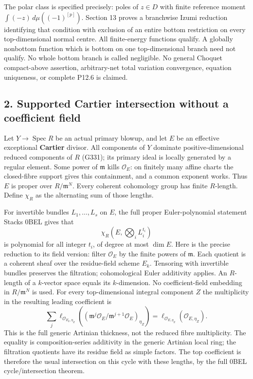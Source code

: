\documentclass[
]{article}
\begin{document}
The polar class is specified precisely: poles of \(z\in D\) with finite
reference moment \(\int(-z)\,d\mu((-1)^{[p]})\). Section 13 proves a
branchwise Izumi reduction identifying that condition with exclusion of
an entire bottom restriction on every top-dimensional normal centre. All
finite-energy functions qualify. A globally nonbottom function which is
bottom on one top-dimensional branch need not qualify. No whole bottom
branch is called negligible. No general Choquet compact-above assertion,
arbitrary-net total variation convergence, equation uniqueness, or
complete P12.6 is claimed.

\subsection{2. Supported Cartier intersection without a coefficient
field}\label{supported-cartier-intersection-without-a-coefficient-field}

Let \(Y\to\operatorname{Spec}R\) be an actual primary blowup, and let
\(E\) be an effective exceptional \textbf{Cartier} divisor. All
components of \(Y\) dominate positive-dimensional reduced components of
\(R\) (G331); its primary ideal is locally generated by a regular
element. Some power of \(\mathfrak m\) kills \(\mathcal O_E\): on
finitely many affine charts the closed-fibre support gives this
containment, and a common exponent works. Thus \(E\) is proper over
\(R/\mathfrak m^N\). Every coherent cohomology group has finite
\(R\)-length. Define \(\chi_R\) as the alternating sum of those lengths.

For invertible bundles \(L_1,\ldots,L_s\) on \(E\), the full proper
Euler-polynomial statement Stacks 0BEL gives that
\[\chi_R(E,\bigotimes_i L_i^{t_i})\] is polynomial for all integer
\(t_i\), of degree at most \(\dim E\). Here is the precise reduction to
its field version: filter \(\mathcal O_E\) by the finite powers of
\(\mathfrak m\). Each quotient is a coherent sheaf over the
residue-field scheme \(E_k\). Tensoring with invertible bundles
preserves the filtration; cohomological Euler additivity applies. An
\(R\)-length of a \(k\)-vector space equals its \(k\)-dimension. No
coefficient-field embedding in \(R/\mathfrak m^N\) is used. For every
top-dimensional integral component \(Z\) the multiplicity in the
resulting leading coefficient is
\[\sum_j\ell_{\mathcal O_{E_k,\eta_Z}}((\mathfrak m^j\mathcal O_E/\mathfrak m^{j+1}\mathcal O_E)_{\eta_Z})
=\ell_{\mathcal O_{E,\eta_Z}}(\mathcal O_{E,\eta_Z}).\] This is the full
generic Artinian thickness, not the reduced fibre multiplicity. The
equality is composition-series additivity in the generic Artinian local
ring; the filtration quotients have its residue field as simple factors.
The top coefficient is therefore the usual intersection on this cycle
with these lengths, by the full 0BEL cycle/intersection theorem.
\end{document}
